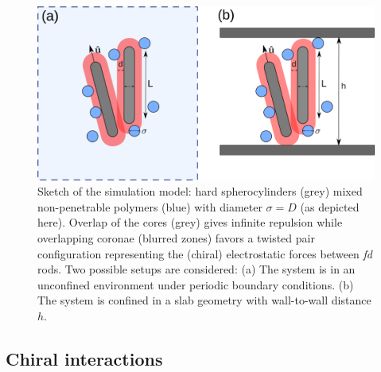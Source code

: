\begin{figure}
	\includegraphics[width = \columnwidth]{figures/chapter-5/spheromans}
	\caption{ Sketch of the simulation model: hard spherocylinders (grey) mixed non-penetrable polymers (blue) with diameter $\sigma = D$ (as depicted here). Overlap of the cores (grey) gives infinite repulsion while overlapping coronae (blurred zones) favors a twisted pair configuration representing the (chiral) electrostatic forces between {\em fd} rods. Two possible setups are considered: (a) The system is in an unconfined environment under periodic boundary conditions. (b) The system is confined in a slab geometry with wall-to-wall distance $h$.  }
	\label{sketch}
\end{figure}


\subsection{Chiral interactions}

